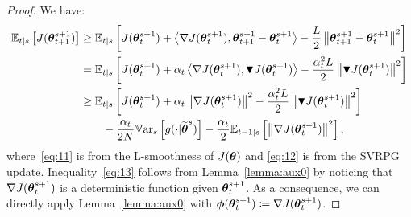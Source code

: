 \begin{proof}
	We have:
	\begin{align}
	\Ets{J(\vtheta_{t+1}^{s+1})} 
	&\geq \Ets{J(\vtheta_t^{s+1})+\dotprod{\gradJ{\vtheta_t^{s+1}}}{\vtheta_{t+1}^{s+1}-\vtheta_t^{s+1}} - \frac{L}{2}\norm[]{\vtheta_{t+1}^{s+1}-\vtheta_t^{s+1}}^2} \label{eq:11}\\
	&= \Ets{J(\vtheta_t^{s+1})+\alpha_t\dotprod{\gradJ{\vtheta_t^{s+1}}}{\gradBlack{\vtheta_t^{s+1}}} - \frac{\alpha_t^2L}{2}\norm[]{\gradBlack{\vtheta_t^{s+1}}}^2} \label{eq:12}\\
	&\geq
	\Ets{J(\vtheta_t^{s+1})+\alpha_t\norm[]{\gradJ{\vtheta_t^{s+1}}}^2 - \frac{\alpha_t^2L}{2}\norm[]{\gradBlack{\vtheta_t^{s+1}}}^2} \nonumber\\
	&\qquad-
	\frac{\alpha_t}{2N}\Vars{g(\cdot\vert\wt{\vtheta}^s)} -\frac{\alpha_t}{2}\Ets[t-1]{\norm[]{\gradJ{\vtheta_t^{s+1}}}^2}, \label{eq:13}
	\end{align}
	where~\eqref{eq:11} is from the L-smoothness of $J(\vtheta)$ \citep{nesterov2013introductory} and \eqref{eq:12} is from the \acs{SVRPG} update.
	Inequality~\ref{eq:13} follows from Lemma~\ref{lemma:aux0} by noticing that $\nabla J(\vtheta^{s+1}_t)$ is a deterministic function given $\vtheta^{s+1}_t$. As a consequence, we can directly apply Lemma~\ref{lemma:aux0} with $\vphi(\vtheta_t^{s+1})\coloneqq\gradJ{\vtheta_t^{s+1}}$.
	

\end{proof}
